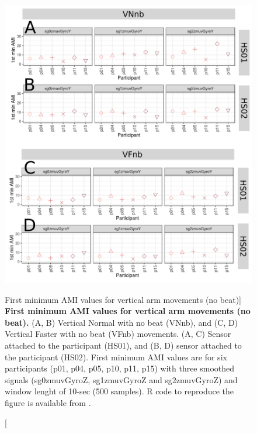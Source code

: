 \begin{figure}
\centering
\includegraphics[width=1.0\textwidth]{ami_Vnb_w10}
	\caption
	[First minimum AMI values for vertical arm movements (no beat)]{
	{\bf First minimum AMI values for vertical arm movements (no beat).}
		(A, B) Vertical Normal with no beat (VNnb), and 
		(C, D) Vertical Faster with no beat (VFnb) movements.
		(A, C) Sensor attached to the participant (HS01), and
		(B, D) sensor attached to the participant (HS02).
		First minimum AMI values are for six participants 
		(p01, p04, p05, p10, p11, p15) with three smoothed 
		signals (sg0zmuvGyroZ, sg1zmuvGyroZ and sg2zmuvGyroZ) and 
		window lenght of 10-sec (500 samples).
		R code to reproduce the figure is available 
		from \cite{xochicale2018}.
        }
    \label{fig:amiVnb}
\end{figure}

